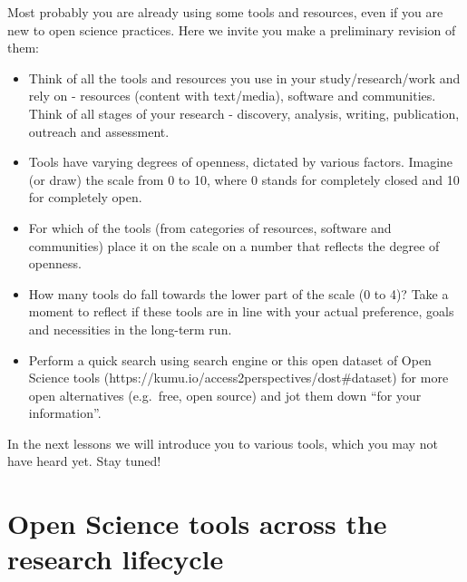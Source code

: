 \documentclass[
  letterpaper,
  DIV=11,
  numbers=noendperiod]{scrreport}
\providecommand{\tightlist}{%
  \setlength{\itemsep}{0pt}\setlength{\parskip}{0pt}}\usepackage{longtable,booktabs,array}
\begin{document}
Most probably you are already using some tools and resources, even if
you are new to open science practices. Here we invite you make a
preliminary revision of them:

\begin{itemize}
\tightlist
\item
  Think of all the tools and resources you use in your
  study/research/work and rely on - resources (content with text/media),
  software and communities. Think of all stages of your research -
  discovery, analysis, writing, publication, outreach and assessment.
\item
  Tools have varying degrees of openness, dictated by various factors.
  Imagine (or draw) the scale from 0 to 10, where 0 stands for
  completely closed and 10 for completely open.
\item
  For which of the tools (from categories of resources, software and
  communities) place it on the scale on a number that reflects the
  degree of openness.
\item
  How many tools do fall towards the lower part of the scale (0 to 4)?
  Take a moment to reflect if these tools are in line with your actual
  preference, goals and necessities in the long-term run.
\item
  Perform a quick search using search engine or this open dataset of
  Open Science tools (https://kumu.io/access2perspectives/dost\#dataset)
  for more open alternatives (e.g.~free, open source) and jot them down
  ``for your information''.
\end{itemize}

In the next lessons we will introduce you to various tools, which you
may not have heard yet. Stay tuned!

\hypertarget{open-science-tools-across-the-research-lifecycle}{%
\chapter{Open Science tools across the research
lifecycle}\label{open-science-tools-across-the-research-lifecycle}}
\end{document}
